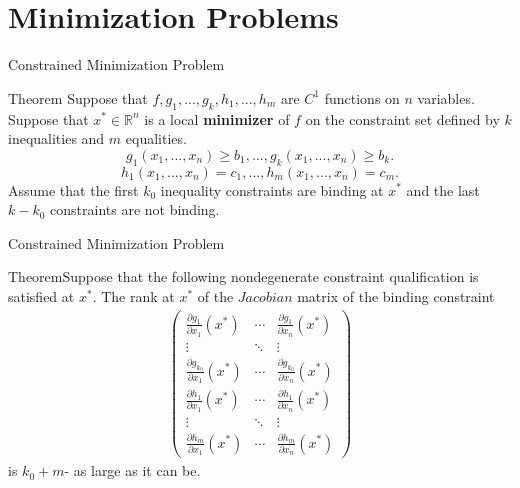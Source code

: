 \documentclass{beamer}
\begin{document}
\section{Minimization Problems}
\begin{frame}{Constrained Minimization Problem}
    \begin{block}{Theorem}
         Suppose that $f, g_1,..., g_k, h_1,...,h_m$ are $C^1$ functions on $n$ variables. Suppose that $x^*\in \mathbb{R}^n$ is a local \textbf{minimizer} of $f$ on the constraint set defined by $k$ inequalities and $m$ equalities. 
    \[g_1(x_1,..., x_n)\geq b_1,..., g_k(x_1,..., x_n)\geq b_k.
    \]
    \[h_1(x_1,..., x_n)=c_1,..., h_m(x_1,..., x_n)=c_m.
    \]
    Assume that the first $k_0$ inequality constraints are binding at $x^*$ and the last $k-k_0$ constraints are not binding.
     \end{block}
\end{frame}
    \begin{frame}{Constrained Minimization Problem}
    \begin{block}{Theorem}Suppose that the following nondegenerate constraint qualification is satisfied at $x^*$. 
    The rank at $x^*$ of the $Jacobian $ matrix of the binding constraint 
    \begin{align*}
        \begin{pmatrix}
            \frac{\partial g_1}{\partial x_1}(x^*) & \cdots & \frac{\partial g_1}{\partial x_n}(x^*)\\ 
            \vdots & \ddots &\vdots \\
            \frac{\partial g_{k_0}}{\partial x_1}(x^*) & \cdots & \frac{\partial g_{k_0}}{\partial x_n}(x^*)\\
              \frac{\partial h_1}{\partial x_1}(x^*) & \cdots & \frac{\partial h_1}{\partial x_n}(x^*)\\ 
            \vdots & \ddots &\vdots \\
            \frac{\partial h_{m}}{\partial x_1}(x^*) & \cdots & \frac{\partial h_{m}}{\partial x_n}(x^*)
        \end{pmatrix}
    \end{align*}
    is $k_0+m$- as large as it can be. 
    \end{block}
\end{frame}
\end{document}

